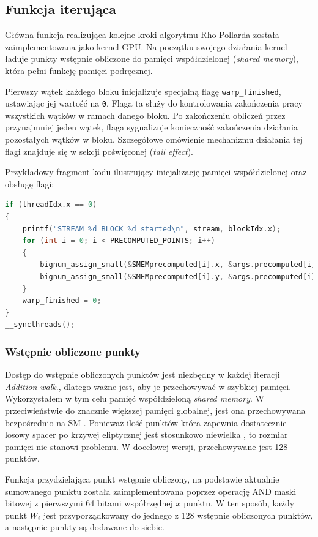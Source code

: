 \subsection{Funkcja iterująca}

Główna funkcja realizująca kolejne kroki algorytmu Rho Pollarda została
zaimplementowana jako kernel GPU. Na początku swojego działania kernel ładuje
punkty wstępnie obliczone do pamięci współdzielonej (\textit{shared memory}),
która pełni funkcję pamięci podręcznej.

Pierwszy wątek każdego bloku inicjalizuje specjalną flagę \texttt{warp\_finished},
ustawiając jej wartość na \texttt{0}. Flaga ta służy do kontrolowania zakończenia
pracy wszystkich wątków w ramach danego bloku. Po zakończeniu obliczeń przez
przynajmniej jeden wątek, flaga sygnalizuje konieczność zakończenia działania
pozostałych wątków w bloku. Szczegółowe omówienie mechanizmu działania tej flagi
znajduje się w sekcji poświęconej (\textit{tail effect}).

Przykładowy fragment kodu ilustrujący inicjalizację pamięci współdzielonej oraz
obsługę flagi:

\begin{lstlisting}[language=C, caption=Inicjalizacja pamięci współdzielonej i flagi \texttt{warp\_finished}]
if (threadIdx.x == 0)
{
    printf("STREAM %d BLOCK %d started\n", stream, blockIdx.x);
    for (int i = 0; i < PRECOMPUTED_POINTS; i++)
    {
        bignum_assign_small(&SMEMprecomputed[i].x, &args.precomputed[i].x);
        bignum_assign_small(&SMEMprecomputed[i].y, &args.precomputed[i].y);
    }
    warp_finished = 0;
}
__syncthreads();
\end{lstlisting}

\subsubsection{Wstępnie obliczone punkty}
Dostęp do wstępnie obliczonych punktów jest niezbędny w każdej iteracji \textit{Addition walk}.,
dlatego ważne jest, aby je przechowywać w szybkiej pamięci. Wykorzystałem w tym celu pamięć współdzieloną \textit{shared memory}.
W przeciwieństwie do znacznie większej pamięci globalnej, jest ona przechowywana bezpośrednio na SM \cite{Cheng2014,Jason2011}.
Ponieważ ilość punktów która zapewnia dostatecznie losowy spacer po krzywej eliptycznej
jest stosunkowo niewielka \cite{Teske2000},
to rozmiar pamięci nie stanowi problemu. W docelowej wersji, przechowywane jest 128 punktów.
\par
Funkcja przydzielająca punkt wstępnie obliczony, na podstawie aktualnie sumowanego punktu została zaimplementowana
poprzez operację AND maski bitowej z pierwszymi 64 bitami współrzędnej
$x$ punktu.
W ten sposób, każdy punkt $W_i$ jest przyporządkowany do jednego z 128 wstępnie obliczonych punktów,
a następnie punkty są dodawane do siebie.

